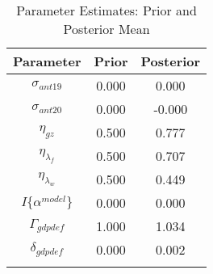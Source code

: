 \documentclass[12pt]{article}
\begin{document}
\pagestyle{empty}
\begin{table}[h]
\centering
\caption{Parameter Estimates: Prior and Posterior Mean}
\vspace*{.5cm}
\begin{tabular}{ccc}\hline 
 Parameter & Prior & Posterior  \tabularnewline \hline
$\sigma_{ant19}$ &    0.000 &    0.000 \\
$\sigma_{ant20}$ &    0.000 &   -0.000 \\
$\eta_{gz}$ &    0.500 &    0.777 \\
$\eta_{\lambda_f}$ &    0.500 &    0.707 \\
$\eta_{\lambda_w}$ &    0.500 &    0.449 \\
$I\{\alpha^{model}\}$ &    0.000 &    0.000 \\
$\Gamma_{gdpdef}$ &    1.000 &    1.034 \\
$\delta_{gdpdef}$ &    0.000 &    0.002 \\
\\ \hline
\end{tabular}
\end{table}
\end{document}
